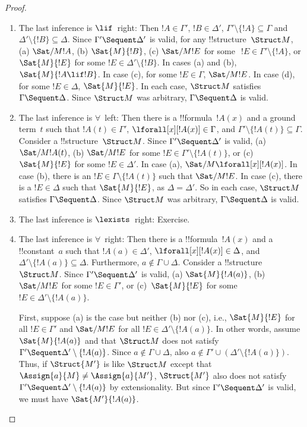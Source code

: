 \documentclass[../../include/open-logic-section]{subfiles}
\begin{document}
\begin{proof}
\begin{enumerate}
\item The last inference is $\lif$~right: Then $!A \in \Gamma'$, $!B
  \in \Delta'$, $\Gamma' \setminus \{!A\} \subseteq \Gamma$ and
  $\Delta' \setminus \{!B\} \subseteq \Delta$.  Since $\Gamma'
  \Sequent \Delta'$ is valid, for any !!{structure}~$\Struct M$, (a)
  $\Sat/{M}{!A}$, (b) $\Sat{M}{!B}$, (c) $\Sat/{M}{!E}$ for some~$~!E
  \in \Gamma' \setminus \{!A\}$, or $\Sat{M}{!E}$ for some $!E \in
  \Delta' \setminus \{!B\}$.  In cases (a) and (b), $\Sat{M}{!A \lif
    !B}$. In case (c), for some $!E \in \Gamma$, $\Sat/{M}{!E}$. In
  case (d), for some $!E \in \Delta$, $\Sat{M}{!E}$. In each case,
  $\Struct M$ satisfies $\Gamma \Sequent \Delta$. Since $\Struct M$
  was arbitrary, $\Gamma \Sequent \Delta$ is valid.
\item The last inference is $\forall$~left: Then there is a
  !!{formula}~$!A(x)$ and a ground term~$t$ such that $!A(t) \in
  \Gamma'$, $\lforall[x][!A(x)] \in \Gamma$, and $\Gamma' \setminus
  \{!A(t)\} \subseteq \Gamma$.  Consider a !!{structure}~$\Struct
  M$. Since $\Gamma' \Sequent \Delta'$ is valid, (a)
  $\Sat/{M}{!A(t)}$, (b) $\Sat/{M}{!E}$ for some $!E \in \Gamma'
  \setminus \{!A(t)\}$, or (c)~$\Sat{M}{!E}$ for some $!E \in
  \Delta'$.  In case (a), $\Sat/{M}{\lforall[x][!A(x)]}$. In case (b),
  there is an $!E \in \Gamma \setminus \{!A(t)\}$ such that
  $\Sat/{M}{!E}$. In case (c), there is a $!E \in \Delta$ such that
  $\Sat{M}{!E}$, as $\Delta = \Delta'$. So in each case, $\Struct M$
  satisfies $\Gamma \Sequent \Delta$. Since $\Struct M$ was arbitrary,
  $\Gamma \Sequent \Delta$ is valid.
\item The last inference is $\lexists$~right: Exercise.
\item The last inference is $\forall$~right: Then there is a
  !!{formula}~$!A(x)$ and a !!{constant}~$a$ such that $!A(a) \in
  \Delta'$, $\lforall[x][!A(x)] \in \Delta$, and $\Delta' \setminus
  \{!A(a)\} \subseteq \Delta$.  Furthermore, $a \notin \Gamma \cup
  \Delta$.  Consider a !!{structure}~$\Struct M$. Since $\Gamma'
  \Sequent \Delta'$ is valid, (a) $\Sat{M}{!A(a)}$, (b) $\Sat/{M}{!E}$
  for some $!E \in \Gamma'$, or (c)~$\Sat{M}{!E}$ for some $!E \in
  \Delta' \setminus \{!A(a)\}$.  

  First, suppose (a) is the case but neither (b) nor (c), i.e.,
  $\Sat{M}{!E}$ for all $!E \in \Gamma'$ and $\Sat/{M}{!E}$ for all
  $!E \in \Delta'\setminus \{!A(a)\}$.  In other words, assume
  $\Sat{M}{!A(a)}$ and that $\Struct M$ does not satisfy $\Gamma'
  \Sequent \Delta' \setminus \{!A(a)\}$.  Since $a \notin \Gamma \cup
  \Delta$, also $a \notin \Gamma' \cup (\Delta' \setminus
  \{!A(a)\})$. Thus, if $\Struct{M'}$ is like $\Struct M$ except that
  $\Assign{a}{M} \neq \Assign{a}{M'}$, $\Struct{M'}$ also does not
  satisfy $\Gamma' \Sequent \Delta' \setminus \{!A(a)\}$ by
  extensionality.  But since $\Gamma' \Sequent \Delta'$ is valid, we
  must have $\Sat{M'}{!A(a)}$.


\end{enumerate}
\end{proof}
\end{document}
